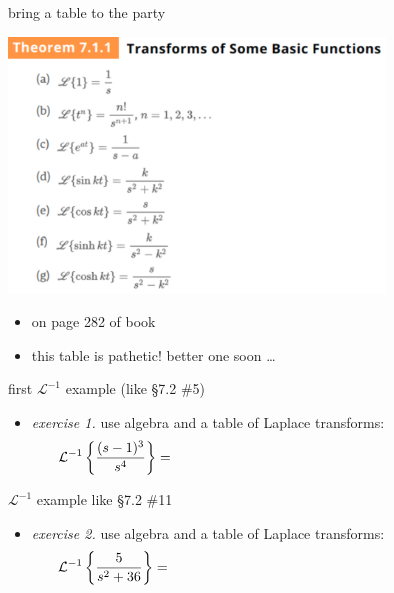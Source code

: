 \documentclass[urlcolor=blue,dvipsnames]{beamer}
\begin{document}
\begin{frame}{bring a table to the party}

\begin{center}
\includegraphics[width=0.75\textwidth]{figs/laplacetable.pdf}
\end{center}

\begin{itemize}
\item on page 282 of book
\item this table is pathetic!  better one soon \dots
\end{itemize}
\end{frame}


\begin{frame}{first $\mathcal{L}^{-1}$ example (like \S7.2 \#5)}

\begin{itemize}
\item \emph{exercise 1.}  use algebra and a table of Laplace transforms:
    $$\LLi{\frac{(s-1)^3}{s^4}} = \hspace{80mm}$$
\end{itemize}

\vspace{50mm}
\end{frame}


\begin{frame}{$\mathcal{L}^{-1}$ example like \S7.2 \#11}

\begin{itemize}
\item \emph{exercise 2.}  use algebra and a table of Laplace transforms:
    $$\LLi{\frac{5}{s^2+36}} = \hspace{80mm}$$
\end{itemize}

\vspace{50mm}
\end{frame}
\end{document}
